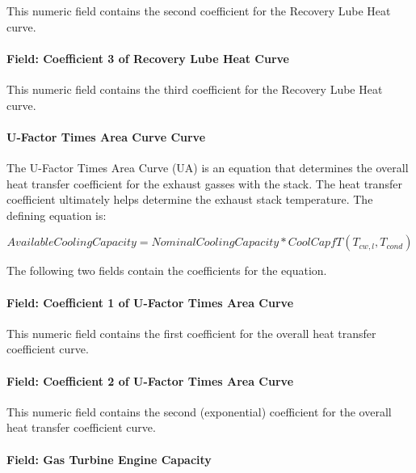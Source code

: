 This numeric field contains the second coefficient for the Recovery Lube Heat curve.

\paragraph{Field: Coefficient 3 of Recovery Lube Heat Curve}\label{field-coefficient-3-of-recovery-lube-heat-curve}

This numeric field contains the third coefficient for the Recovery Lube Heat curve.

\paragraph{U-Factor Times Area Curve Curve}\label{u-factor-times-area-curve-curve}

The U-Factor Times Area Curve (UA) is an equation that determines the overall heat transfer coefficient for the exhaust gasses with the stack. The heat transfer coefficient ultimately helps determine the exhaust stack temperature. The defining equation is:

\begin{equation}
AvailableCoolingCapacity = NominalCoolingCapacity*CoolCapfT\left( {{T_{cw,l}},{T_{cond}}} \right)
\end{equation}

The following two fields contain the coefficients for the equation.

\paragraph{Field: Coefficient 1 of U-Factor Times Area Curve}\label{field-coefficient-1-of-u-factor-times-area-curve-1-000}

This numeric field contains the first coefficient for the overall heat transfer coefficient curve.

\paragraph{Field: Coefficient 2 of U-Factor Times Area Curve}\label{field-coefficient-2-of-u-factor-times-area-curve-1-000}

This numeric field contains the second (exponential) coefficient for the overall heat transfer coefficient curve.

\paragraph{Field: Gas Turbine Engine Capacity}\label{field-gas-turbine-engine-capacity}


